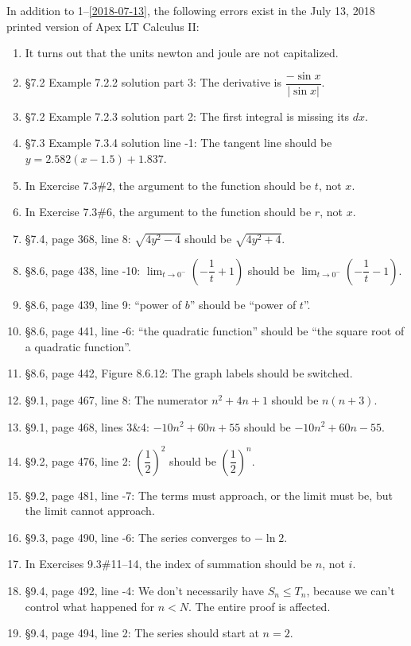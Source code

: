 \documentclass{amsart}
\makeatletter
\newcommand{\ds}{\displaystyle}
\newcommand{\abs}[1]{\left\lvert#1\right\rvert}
\newcommand{\reforzero}[1]{%
 \@ifundefined{r@#1}{0}{\ref{#1}}%
}
\makeatother
\begin{document}
In addition to 1--\ref{2018-07-13}, the following errors exist in the July 13, 2018 printed version of Apex LT Calculus II:
\begin{enumerate}\setcounter{enumi}{\reforzero{2018-07-13}}
\item It turns out that the units newton and joule are not capitalized.
\item \S7.2 Example 7.2.2 solution part 3: The derivative is $\dfrac{-\sin x}{\abs{\sin x}}$.
\item \S7.2 Example 7.2.3 solution part 2: The first integral is missing its $dx$.
\item \S7.3 Example 7.3.4 solution line -1: The tangent line should be $y=2.582(x-1.5)+1.837$.
\item In Exercise 7.3\#2, the argument to the function should be $t$, not $x$.
\item In Exercise 7.3\#6, the argument to the function should be $r$, not $x$.
\item \S7.4, page 368, line 8: $\sqrt{4y^2-4}$ should be $\sqrt{4y^2+4}$.
\item \S8.6, page 438, line -10: $\ds\lim_{t\to0^-}\left(-\dfrac1t+1\right)$ should be $\ds\lim_{t\to0^-}\left(-\dfrac1t-1\right)$.
\item \S8.6, page 439, line 9: ``power of $b$'' should be ``power of $t$''.
\item \S8.6, page 441, line -6: ``the quadratic function'' should be ``the square root of a quadratic function''.
\item \S8.6, page 442, Figure 8.6.12: The graph labels should be switched.
\item \S9.1, page 467, line 8: The numerator $n^2+4n+1$ should be $n(n+3)$.
\item \S9.1, page 468, lines 3\&4: $-10n^2+60n+55$ should be $-10n^2+60n-55$.
\item \S9.2, page 476, line 2: $\left(\dfrac12\right)^2$ should be $\left(\dfrac12\right)^n$.
\item \S9.2, page 481, line -7: The terms must approach, or the limit must be, but the limit cannot approach.
\item \S9.3, page 490, line -6: The series converges to $-\ln 2$.
\item In Exercises 9.3\#11--14, the index of summation should be $n$, not $i$.
\item \S9.4, page 492, line -4: We don't necessarily have $S_n\le T_n$, because we can't control what happened for $n<N$.  The entire proof is affected.
\item \S9.4, page 494, line 2: The series should start at $n=2$.

\end{enumerate}
\end{document}
